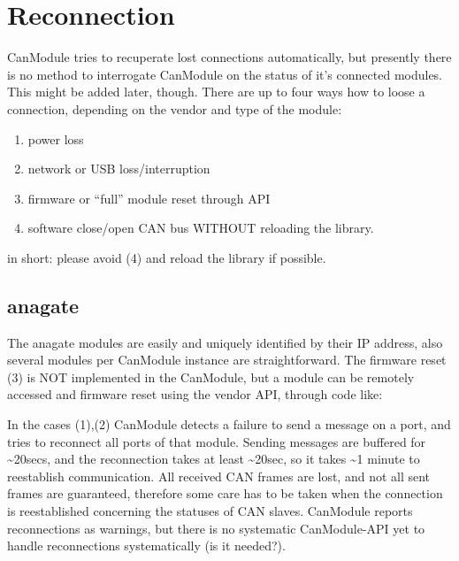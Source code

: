 \documentclass[letterpaper,10pt,english]{sphinxmanual}
\begin{document}
\chapter{Reconnection}
\label{\detokenize{reconnection:reconnection}}\label{\detokenize{reconnection::doc}}
CanModule tries to recuperate lost connections automatically, but presently there is no method
to interrogate CanModule on the status of it’s connected modules. This might be added later, though.
There are up to four ways how to loose a connection, depending on the vendor and type of the module:
\begin{enumerate}
\def\theenumi{\arabic{enumi}}
\def\labelenumi{(\theenumi )}
\makeatletter\def\p@enumii{\p@enumi (\theenumi )}\makeatother
\item {} 
power loss

\item {} 
network or USB loss/interruption

\item {} 
firmware or “full” module reset through API

\item {} 
software close/open CAN bus WITHOUT reloading the library.

\end{enumerate}

in short: please avoid (4) and reload the library if possible.


\section{anagate}
\label{\detokenize{reconnection:anagate}}
The anagate modules are easily and uniquely identified by their IP address, also several modules
per CanModule instance are straightforward. The firmware reset (3) is NOT implemented in the CanModule,
but a module can be remotely accessed and firmware reset using the vendor API, through code like:

\begin{sphinxVerbatim}[commandchars=\\\{\}]
    
      
\end{sphinxVerbatim}

In the cases (1),(2) CanModule detects a failure to send a message on a port, and tries to reconnect
all ports of that module. Sending messages are buffered for \textasciitilde{}20secs, and the reconnection
takes at least \textasciitilde{}20sec, so it takes \textasciitilde{}1 minute to reestablish communication. All received CAN frames
are lost, and not all sent frames are guaranteed, therefore some care has to be taken when the
connection is reestablished concerning the statuses of CAN slaves. CanModule reports reconnections
as warnings, but there is no systematic CanModule-API yet to handle reconnections
systematically (is it needed?).
\end{document}

